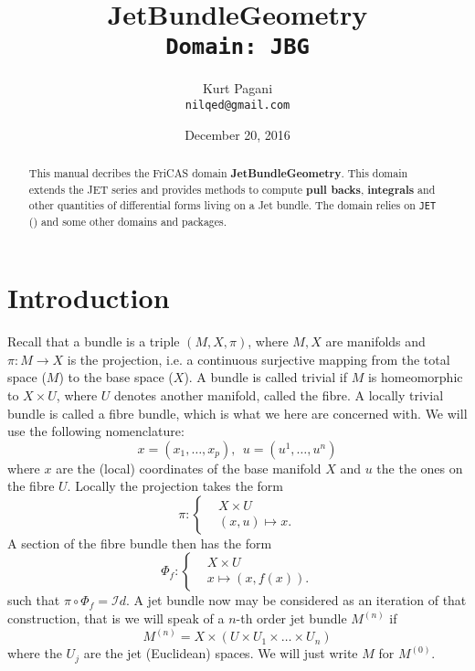 \documentclass[12pt,a4paper]{article}
\author{Kurt Pagani \\ {\tt nilqed@gmail.com}}
\date{December 20, 2016}
\title{JetBundleGeometry \\ {\small\tt Domain: JBG}}
\begin{document}
\maketitle
%
\begin{abstract}
This manual decribes the FriCAS domain {\bf JetBundleGeometry}.
This domain extends the JET series and provides methods to compute
{\bf pull backs}, {\bf integrals} and other quantities of 
differential forms living on a Jet bundle. The domain relies on
{\tt JET} (\cite{wms:jet}) and some other domains and packages. 
\end{abstract}
%
\tableofcontents
\section{Introduction}
Recall that a bundle is a triple $(M,X,\pi)$, where $M,X$ are manifolds
and $\pi:M\rightarrow X$ is the projection, i.e. a continuous surjective
mapping from the total space ($M$) to the base space ($X$). A bundle is 
called trivial if $M$ is homeomorphic to $X\times U$, where
$U$ denotes another manifold, called the fibre. A locally trivial bundle
is called a fibre bundle, which is what we here are concerned with.
We will use the following nomenclature: 
\begin{displaymath}
   x=(x_1,\ldots,x_p), \ \ u=(u^1,\ldots,u^n)
\end{displaymath}
where $x$ are the (local) coordinates of the base manifold $X$ and $u$
the the ones on the fibre $U$. Locally the projection takes the form
\begin{displaymath}
 \pi:\begin{cases} 
      & X\times U \\
      & (x,u) \mapsto x.
   \end{cases}
\end{displaymath}
A section of the fibre bundle then has the form
\begin{displaymath}
 \Phi_f:\begin{cases} 
      & X\times U \\
      & x \mapsto (x,f(x)).
\end{cases}
\end{displaymath}
such that $\pi\circ \Phi_f = \mathcal{I}d$.
A jet bundle now may be considered as an iteration of that construction,
that is we will speak of a $n$-th order jet bundle $M^{(n)}$ if
\begin{displaymath}
 M^{(n)} = X \times \left( U\times U_1\times\ldots\times U_n  \right)
\end{displaymath}  
where the $U_j$ are the jet (Euclidean) spaces. We will just write $M$
for $M^{(0)}$.
\end{document}
